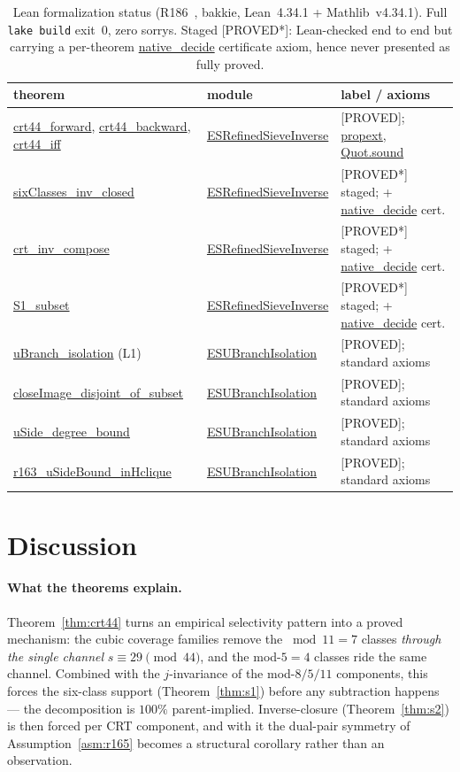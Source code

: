 \documentclass[11pt,a4paper]{article}
\theoremstyle{definition}
\begin{document}
\begin{table}[t]
  \centering
  \caption{Lean formalization status (R186~\cite{R186}, bakkie,
    Lean~4.34.1 + Mathlib~v4.34.1). Full \texttt{lake build} exit~0,
    zero sorrys. Staged [PROVED*]: Lean-checked end to end but carrying
    a per-theorem \url{native_decide} certificate axiom, hence never
    presented as fully proved.}
  \label{tab:lean}
  \begin{tabular}{lll}
    \toprule
    theorem & module & label / axioms \\
    \midrule
    \url{crt44_forward}, \url{crt44_backward}, \url{crt44_iff}
      & \url{ESRefinedSieveInverse} & [PROVED]; \url{propext}, \url{Quot.sound} \\
    \url{sixClasses_inv_closed}
      & \url{ESRefinedSieveInverse} & [PROVED*] staged; + \url{native_decide} cert. \\
    \url{crt_inv_compose}
      & \url{ESRefinedSieveInverse} & [PROVED*] staged; + \url{native_decide} cert. \\
    \url{S1_subset}
      & \url{ESRefinedSieveInverse} & [PROVED*] staged; + \url{native_decide} cert. \\
    \url{uBranch_isolation} (L1)
      & \url{ESUBranchIsolation} & [PROVED]; standard axioms \\
    \url{closeImage_disjoint_of_subset}
      & \url{ESUBranchIsolation} & [PROVED]; standard axioms \\
    \url{uSide_degree_bound}
      & \url{ESUBranchIsolation} & [PROVED]; standard axioms \\
    \url{r163_uSideBound_inHclique}
      & \url{ESUBranchIsolation} & [PROVED]; standard axioms \\
    \bottomrule
  \end{tabular}
\end{table}

\section{Discussion}
\label{sec:discussion}

\paragraph{What the theorems explain.} Theorem~\ref{thm:crt44} turns an
empirical selectivity pattern into a proved mechanism: the cubic
coverage families remove the $\bmod11=7$ classes \emph{through the
single channel} $s\equiv29\pmod{44}$, and the mod-$5=4$ classes ride
the same channel. Combined with the $j$-invariance of the mod-$8/5/11$
components, this forces the six-class support (Theorem~\ref{thm:s1})
before any subtraction happens --- the decomposition is $100\%$
parent-implied. Inverse-closure (Theorem~\ref{thm:s2}) is then forced
per CRT component, and with it the dual-pair symmetry of
Assumption~\ref{asm:r165} becomes a structural corollary rather than
an observation.
\end{document}
